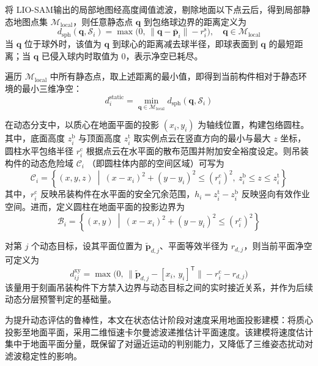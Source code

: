 将 LIO-SAM输出的局部地图经高度阈值滤波，剔除地面以下点云后，得到局部静态地图点集 $\mathcal{M}_{\mathrm{local}}$，则任意静态点 $\mathbf{q}$ 到包络球边界的距离定义为
\begin{equation}
d_{\mathrm{sph}}(\mathbf{q},\mathcal{S}_i)=\max\bigl(0,\,\|\mathbf{q}-\bar{\mathbf{p}}_i\|-r_i^{\mathrm{s}}\bigr),\quad \mathbf{q}\in\mathcal{M}_{\mathrm{local}}
\label{eq:ch4_dist_sphere}
\end{equation}
当 $\mathbf{q}$ 位于球外时，该值为 $\mathbf{q}$ 到球心的距离减去球半径，即球表面到 $\mathbf{q}$ 的最短距离；当 $\mathbf{q}$ 已侵入球内时取值为 $0$，表示净空已耗尽。

遍历 $\mathcal{M}_{\mathrm{local}}$ 中所有静态点，取上述距离的最小值，即得到当前构件相对于静态环境的最小三维净空：
\begin{equation}
d_i^{\mathrm{static}}=\min_{\mathbf{q}\in\mathcal{M}_{\mathrm{local}}}d_{\mathrm{sph}}(\mathbf{q},\mathcal{S}_i)
\label{eq:ch4_static_clearance}
\end{equation}

在动态分支中，以质心在地面平面的投影 $(x_i,y_i)$ 为轴线位置，构建包络圆柱。其中，底面高度 $z_i^{\mathrm{b}}$ 与顶面高度 $z_i^{\mathrm{t}}$ 取实例点云在竖直方向的最小与最大 $z$ 坐标，圆柱水平包络半径 $r_i^{\mathrm{c}}$ 根据点云在水平面的散布范围并附加安全裕度设定。则吊装构件的动态危险域 $\mathcal{C}_i$ （即圆柱体内部的空间区域）可写为
\begin{equation}
\mathcal{C}_i=\left\{(x,y,z)\ \middle|\ (x-x_i)^2+(y-y_i)^2\le (r_i^{\mathrm{c}})^2,\ z_i^{\mathrm{b}}\le z\le z_i^{\mathrm{t}}\right\}
\label{eq:ch4_envelope_cylinder}
\end{equation}
其中，$r_i^{\mathrm{c}}$ 反映吊装构件在水平面的安全冗余范围，$h_i=z_i^{\mathrm{t}}-z_i^{\mathrm{b}}$ 反映竖向有效作业空间。进而，定义圆柱在地面平面的投影边界为
\begin{equation}
\mathcal{B}_i=\left\{(x,y)\ \middle|\ (x-x_i)^2+(y-y_i)^2\le (r_i^{\mathrm{c}})^2\right\}
\end{equation}

对第 $j$ 个动态目标，设其平面位置为 $\tilde{\mathbf{p}}_{d,j}$、平面等效半径为 $r_{d,j}$，则当前平面净空可定义为
\begin{equation}
d_{ij}^{\mathrm{xy}}=\max\bigl(0,\,\|\tilde{\mathbf{p}}_{d,j}-[x_i,\,y_i]^\mathsf{T}\|-r_i^{\mathrm{c}}-r_{d,j}\bigr)
\end{equation}
该量用于刻画吊装构件下方禁入边界与动态目标之间的实时接近关系，并作为后续动态分层预警判定的基础量。

为提升动态评估的鲁棒性，本文在状态估计阶段对速度采用地面投影建模：将质心投影至地面平面，采用二维恒速卡尔曼滤波递推估计平面速度。该建模将速度估计集中于地面平面分量，既保留了对逼近运动的判别能力，又降低了三维姿态扰动对滤波稳定性的影响。

